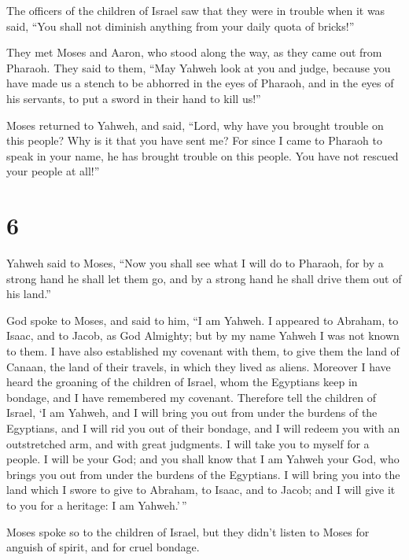  The officers of the children of Israel saw that they
were in trouble when it was said, ``You shall not diminish anything from
your daily quota of bricks!''

 They met Moses and Aaron, who stood along the way, as
they came out from Pharaoh.  They said to them, ``May
Yahweh look at you and judge, because you have made us a stench to be
abhorred in the eyes of Pharaoh, and in the eyes of his servants, to put
a sword in their hand to kill us!''

 Moses returned to Yahweh, and said, ``Lord, why have you
brought trouble on this people? Why is it that you have sent me?
 For since I came to Pharaoh to speak in your name, he
has brought trouble on this people. You have not rescued your people at
all!''

\hypertarget{section-5}{%
\section{6}\label{section-5}}

 Yahweh said to Moses, ``Now you shall see what I will do
to Pharaoh, for by a strong hand he shall let them go, and by a strong
hand he shall drive them out of his land.''

 God spoke to Moses, and said to him, ``I am Yahweh.
 I appeared to Abraham, to Isaac, and to Jacob, as God
Almighty; but by my name Yahweh I was not known to them. 
I have also established my covenant with them, to give them the land of
Canaan, the land of their travels, in which they lived as aliens.
 Moreover I have heard the groaning of the children of
Israel, whom the Egyptians keep in bondage, and I have remembered my
covenant.  Therefore tell the children of Israel, `I am
Yahweh, and I will bring you out from under the burdens of the
Egyptians, and I will rid you out of their bondage, and I will redeem
you with an outstretched arm, and with great judgments.  I
will take you to myself for a people. I will be your God; and you shall
know that I am Yahweh your God, who brings you out from under the
burdens of the Egyptians.  I will bring you into the land
which I swore to give to Abraham, to Isaac, and to Jacob; and I will
give it to you for a heritage: I am Yahweh.'\,''

 Moses spoke so to the children of Israel, but they didn't
listen to Moses for anguish of spirit, and for cruel bondage.

